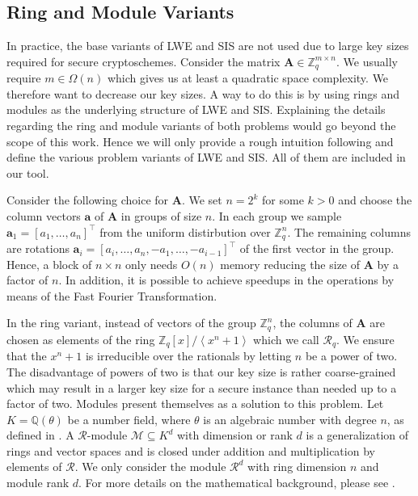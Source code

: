

\subsection{Ring and Module Variants}\label{sec:ring-module}
In practice, the base variants of LWE and SIS are not used due to large key sizes required for secure cryptoschemes. Consider the matrix $\mathbf{A} \in \mathbb{Z}_q^{m \times n}$. We usually require $m \in \Omega(n)$ which gives us at least a quadratic space complexity. We therefore want to decrease our key sizes. A way to do this is by using rings and modules as the underlying structure of LWE and SIS. Explaining the details regarding the ring and module variants of both problems would go beyond the scope of this work. Hence we will only provide a rough intuition following \cite{Reg10} and define the various problem variants of LWE and SIS. All of them are included in our tool.

Consider the following choice for $\mathbf{A}$. We set $n=2^k$ for some $k > 0$ and choose the column vectors $\mathbf{a}$ of $\mathbf{A}$ in groups of size $n$. In each group we sample $\mathbf{a}_1 = [a_1, \ldots, a_n]^\intercal$ from the uniform distirbution over $\mathbb{Z}_q^{n}$. The remaining columns are rotations $\mathbf{a}_i = [a_i, \ldots, a_n, -a_1, \ldots, -a_{i-1}]^\intercal$ of the first vector in the group. Hence, a block of $n\times n$ only needs $O(n)$ memory reducing the size of $\mathbf{A}$ by a factor of $n$. In addition, it is possible to achieve speedups in the operations by means of the Fast Fourier Transformation.

In the ring variant, instead of vectors of the group $\mathbb{Z}_q^n$, the columns of $\mathbf{A}$ are chosen as elements of the ring $\mathbb{Z}_q\left[x\right] / \left\langle x^n + 1 \right\rangle$ which we call $\mathcal{R}_q$. We ensure that the  $x^n + 1$ is irreducible over the rationals by letting $n$ be a power of two. The disadvantage of powers of two is that our key size is rather coarse-grained which may result in a larger key size for a secure instance than needed up to a factor of two. Modules present themselves as a solution to this problem. Let $K=\mathbb{Q}(\theta)$ be a number field, where $\theta$ is an algebraic number with degree $n$, as defined in \cite{LS15}. A $\mathcal{R}$-module $\mathcal{M} \subseteq K^d$ with dimension or rank $d$ is a generalization of rings and vector spaces and is closed under addition and multiplication by elements of $\mathcal{R}$. We only consider the module $\mathcal{R}^d$ with ring dimension $n$ and module rank $d$. For more details on the mathematical background, please see \cite{LS15}. %

